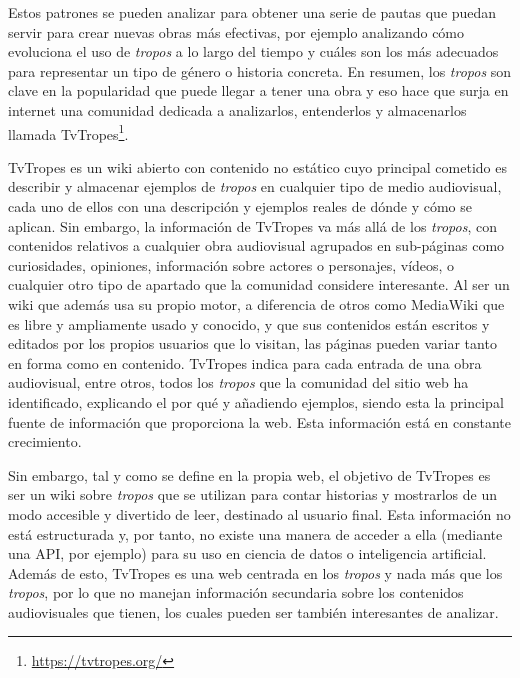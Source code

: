 Estos patrones se pueden analizar para obtener una serie de pautas que puedan
servir para crear nuevas obras más efectivas, por ejemplo analizando cómo
evoluciona el uso de \textit{tropos} a lo largo del tiempo y cuáles son los más
adecuados para representar un tipo de género o historia concreta. En resumen,
los \textit{tropos} son clave en la popularidad que puede llegar a tener una
obra y eso hace que surja en internet una comunidad dedicada a analizarlos,
entenderlos y almacenarlos llamada
TvTropes\footnote{\url{https://tvtropes.org/}}. 

TvTropes es un wiki abierto con contenido no estático cuyo principal cometido es
describir y almacenar ejemplos de \textit{tropos} en cualquier tipo de medio
audiovisual, cada uno de ellos con una descripción y ejemplos reales de dónde y
cómo se aplican. Sin embargo, la información de TvTropes va más allá de los
\textit{tropos}, con contenidos relativos a cualquier obra audiovisual agrupados
en sub-páginas como curiosidades, opiniones, información sobre actores o
personajes, vídeos, o cualquier otro tipo de apartado que la comunidad considere
interesante. Al ser un wiki que además usa su propio motor, a diferencia de
otros como MediaWiki que es libre y ampliamente usado y conocido, y que sus
contenidos están escritos y editados por los propios usuarios que lo visitan,
las páginas pueden variar tanto en forma como en contenido. TvTropes indica para
cada entrada de una obra audiovisual, entre otros, todos los \textit{tropos} que
la comunidad del sitio web ha identificado, explicando el por qué y añadiendo
ejemplos, siendo esta la principal fuente de información que proporciona la web.
Esta información está en constante crecimiento.

Sin embargo, tal y como se define en la propia web, el objetivo de TvTropes es
ser un wiki sobre \textit{tropos} que se utilizan para contar historias y
mostrarlos de un modo accesible y divertido de leer, destinado al usuario final.
Esta información no está estructurada y, por tanto, no existe una manera de
acceder a ella (mediante una API, por ejemplo) para su uso en ciencia de datos o
inteligencia artificial. Además de esto, TvTropes es una web centrada en los
\textit{tropos} y nada más que los \textit{tropos}, por lo que no manejan
información secundaria sobre los contenidos audiovisuales que tienen, los cuales
pueden ser también interesantes de analizar.

